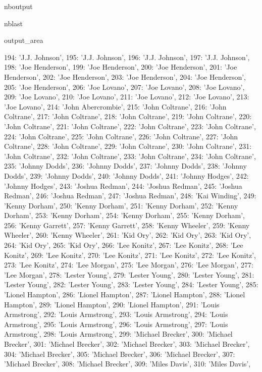 \documentclass[letterpaper,10pt,english]{sphinxmanual}
\begin{document}
\begin{sphinxuseclass}{nboutput}
\begin{sphinxuseclass}{nblast}
{\begin{sphinxuseclass}{output_area}
\begin{sphinxuseclass}{}
\begin{sphinxVerbatim}[commandchars=\\\{\}]
 194: 'J.J. Johnson',
 195: 'J.J. Johnson',
 196: 'J.J. Johnson',
 197: 'J.J. Johnson',
 198: 'Joe Henderson',
 199: 'Joe Henderson',
 200: 'Joe Henderson',
 201: 'Joe Henderson',
 202: 'Joe Henderson',
 203: 'Joe Henderson',
 204: 'Joe Henderson',
 205: 'Joe Henderson',
 206: 'Joe Lovano',
 207: 'Joe Lovano',
 208: 'Joe Lovano',
 209: 'Joe Lovano',
 210: 'Joe Lovano',
 211: 'Joe Lovano',
 212: 'Joe Lovano',
 213: 'Joe Lovano',
 214: 'John Abercrombie',
 215: 'John Coltrane',
 216: 'John Coltrane',
 217: 'John Coltrane',
 218: 'John Coltrane',
 219: 'John Coltrane',
 220: 'John Coltrane',
 221: 'John Coltrane',
 222: 'John Coltrane',
 223: 'John Coltrane',
 224: 'John Coltrane',
 225: 'John Coltrane',
 226: 'John Coltrane',
 227: 'John Coltrane',
 228: 'John Coltrane',
 229: 'John Coltrane',
 230: 'John Coltrane',
 231: 'John Coltrane',
 232: 'John Coltrane',
 233: 'John Coltrane',
 234: 'John Coltrane',
 235: 'Johnny Dodds',
 236: 'Johnny Dodds',
 237: 'Johnny Dodds',
 238: 'Johnny Dodds',
 239: 'Johnny Dodds',
 240: 'Johnny Dodds',
 241: 'Johnny Hodges',
 242: 'Johnny Hodges',
 243: 'Joshua Redman',
 244: 'Joshua Redman',
 245: 'Joshua Redman',
 246: 'Joshua Redman',
 247: 'Joshua Redman',
 248: 'Kai Winding',
 249: 'Kenny Dorham',
 250: 'Kenny Dorham',
 251: 'Kenny Dorham',
 252: 'Kenny Dorham',
 253: 'Kenny Dorham',
 254: 'Kenny Dorham',
 255: 'Kenny Dorham',
 256: 'Kenny Garrett',
 257: 'Kenny Garrett',
 258: 'Kenny Wheeler',
 259: 'Kenny Wheeler',
 260: 'Kenny Wheeler',
 261: 'Kid Ory',
 262: 'Kid Ory',
 263: 'Kid Ory',
 264: 'Kid Ory',
 265: 'Kid Ory',
 266: 'Lee Konitz',
 267: 'Lee Konitz',
 268: 'Lee Konitz',
 269: 'Lee Konitz',
 270: 'Lee Konitz',
 271: 'Lee Konitz',
 272: 'Lee Konitz',
 273: 'Lee Konitz',
 274: 'Lee Morgan',
 275: 'Lee Morgan',
 276: 'Lee Morgan',
 277: 'Lee Morgan',
 278: 'Lester Young',
 279: 'Lester Young',
 280: 'Lester Young',
 281: 'Lester Young',
 282: 'Lester Young',
 283: 'Lester Young',
 284: 'Lester Young',
 285: 'Lionel Hampton',
 286: 'Lionel Hampton',
 287: 'Lionel Hampton',
 288: 'Lionel Hampton',
 289: 'Lionel Hampton',
 290: 'Lionel Hampton',
 291: 'Louis Armstrong',
 292: 'Louis Armstrong',
 293: 'Louis Armstrong',
 294: 'Louis Armstrong',
 295: 'Louis Armstrong',
 296: 'Louis Armstrong',
 297: 'Louis Armstrong',
 298: 'Louis Armstrong',
 299: 'Michael Brecker',
 300: 'Michael Brecker',
 301: 'Michael Brecker',
 302: 'Michael Brecker',
 303: 'Michael Brecker',
 304: 'Michael Brecker',
 305: 'Michael Brecker',
 306: 'Michael Brecker',
 307: 'Michael Brecker',
 308: 'Michael Brecker',
 309: 'Miles Davis',
 310: 'Miles Davis',

\end{sphinxVerbatim}
\end{sphinxuseclass}
\end{sphinxuseclass}}
\end{sphinxuseclass}
\end{sphinxuseclass}
\end{document}
